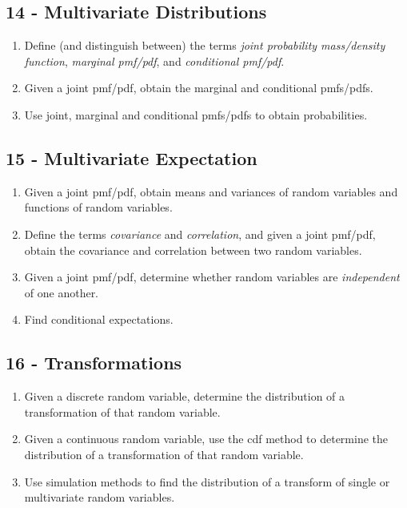 \documentclass[
  letterpaper,
  DIV=11,
  numbers=noendperiod]{scrreprt}
\begin{document}
\subsection*{14 - Multivariate
Distributions}\label{multivariate-distributions}

\begin{enumerate}
\def\labelenumi{\arabic{enumi})}
\item
  Define (and distinguish between) the terms \emph{joint probability
  mass/density function}, \emph{marginal pmf/pdf}, and \emph{conditional
  pmf/pdf}.
\item
  Given a joint pmf/pdf, obtain the marginal and conditional pmfs/pdfs.
\item
  Use joint, marginal and conditional pmfs/pdfs to obtain probabilities.
\end{enumerate}

\subsection*{15 - Multivariate
Expectation}\label{multivariate-expectation}

\begin{enumerate}
\def\labelenumi{\arabic{enumi})}
\item
  Given a joint pmf/pdf, obtain means and variances of random variables
  and functions of random variables.
\item
  Define the terms \emph{covariance} and \emph{correlation}, and given a
  joint pmf/pdf, obtain the covariance and correlation between two
  random variables.
\item
  Given a joint pmf/pdf, determine whether random variables are
  \emph{independent} of one another.
\item
  Find conditional expectations.
\end{enumerate}

\subsection*{16 - Transformations}\label{transformations}

\begin{enumerate}
\def\labelenumi{\arabic{enumi})}
\item
  Given a discrete random variable, determine the distribution of a
  transformation of that random variable.
\item
  Given a continuous random variable, use the cdf method to determine
  the distribution of a transformation of that random variable.
\item
  Use simulation methods to find the distribution of a transform of
  single or multivariate random variables.
\end{enumerate}
\end{document}
